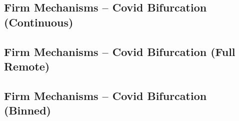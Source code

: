 \documentclass{article}
\newcommand{\cleanedresultsdir}{../../results/cleaned}
\begin{document}
\clearpage
\begin{landscape}

\subsection{Firm Mechanisms – Covid Bifurcation (Continuous)}



\subsection{Firm Mechanisms – Covid Bifurcation (Full Remote)}


\subsection{Firm Mechanisms – Covid Bifurcation (Binned)}




\end{landscape}

\end{document}
